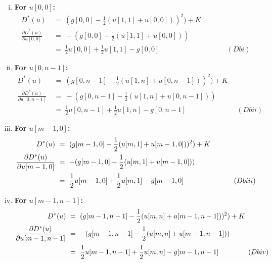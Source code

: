 \documentclass{report}
\begin{document}
					\begin{enumerate}[(i)]
						\item \textbf{For $u[0,0]$:}
						\vspace{-0.4cm}
						\begin{align*}
							D^*(u) \ & = \ (g[0,0] - \frac{1}{2} (u[1,1] + u[0,0]))^2) + K \\
							\frac{\partial D^*(u)}{\partial u[0,0]} \ & = \ - (g[0,0] - \frac{1}{2} (u[1,1] + u[0,0])) \\
							& = \ \frac{1}{2} u[0,0]  + \frac{1}{2} u[1,1] - g[0,0] \hspace{4cm} (Dbi)
						\end{align*}
						\item \textbf{For $u[0,n-1]$:}
						\vspace{-0.4cm}
						\begin{align*}
							D^*(u) \ & = \ (g[0,n-1] - \frac{1}{2} (u[1,n] + u[0,n-1]))^2) + K \\
							\frac{\partial D^*(u)}{\partial u[0,n-1]} \ & = \ - (g[0,n-1] - \frac{1}{2} (u[1,n] + u[0,n-1])) \\
							& = \ \frac{1}{2} u[0,n-1]  + \frac{1}{2} u[1,n] - g[0,n-1] \hspace{3cm} (Dbii)
						\end{align*}
						\item \textbf{For $u[m-1,0]$:}
						\vspace{-0.4cm}
						\begin{align*}
							D^*(u) \ & = \ (g[m-1,0] - \frac{1}{2} (u[m,1] + u[m-1,0]))^2) + K \\
							\frac{\partial D^*(u)}{\partial u[m-1,0]} \ & = \ - (g[m-1,0] - \frac{1}{2} (u[m,1] + u[m-1,0])) \\
							& = \ \frac{1}{2} u[m-1,0]  + \frac{1}{2} u[m,1] - g[m-1,0] \hspace{2.5cm} (Dbiii)
						\end{align*}
						\item \textbf{For $u[m-1,n-1]$:}
						\vspace{-0.4cm}
						\begin{align*}
							D^*(u) \ & = \ (g[m-1,n-1] - \frac{1}{2} (u[m,n] + u[m-1,n-1]))^2) + K \\
							\frac{\partial D^*(u)}{\partial u[m-1,n-1]} \ & = \ - (g[m-1,n-1] - \frac{1}{2} (u[m,n] + u[m-1,n-1])) \\
							& = \ \frac{1}{2} u[m-1,n-1]  + \frac{1}{2} u[m,n] - g[m-1,n-1] \hspace{1.5cm} (Dbiv)
						\end{align*}
					\end{enumerate}
				\closesection
			\closesection
\end{document}
